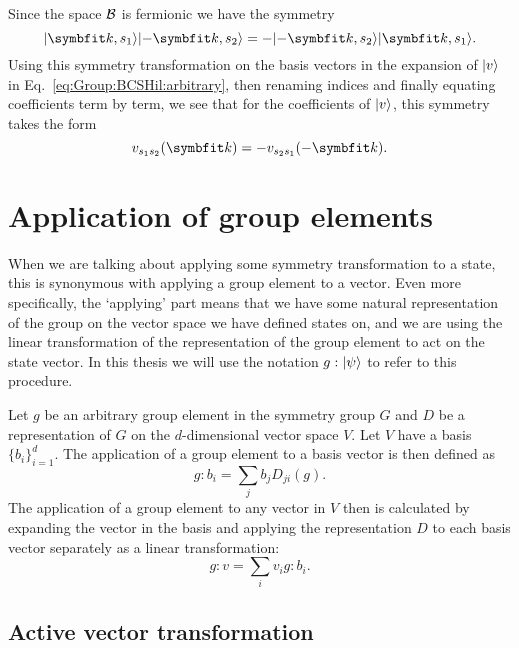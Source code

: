 Since the space $\mathcal{B}$ is fermionic we have the symmetry 
\begin{equation}
    \label{eq:Group:BCSHil:fermSymm}
    \ket{\v{k},s_1}\ket{-\v{k},s_2} = -\ket{-\v{k},s_2}\ket{\v{k},s_1}.
\end{equation}
Using this symmetry transformation on the basis vectors in the expansion of $\lvert v \rangle$ in Eq.~\eqref{eq:Group:BCSHil:arbitrary}, then renaming indices
and finally equating coefficients term by term, we see that for the coefficients of $\lvert v \rangle$, this symmetry takes the form
\begin{equation}
    \label{eq:GroupBCSHil:fermSymmCoeff}
    v_{s_1s_2}(\v{k}) = -v_{s_2s_1}(-\v{k}).
\end{equation}


\section{Application of group elements}

When we are talking about applying some symmetry transformation to a state, this is synonymous with applying a group element to a vector.
Even more specifically, the `applying' part means that we have some natural representation of the group on the vector space we have defined
states on, and we are using the linear transformation of the representation of the group element to act on the state vector. In this
thesis we will use the notation $g:\lvert \psi \rangle$ to refer to this procedure.

Let $g$ be an arbitrary group element in the symmetry group $G$ and $D$ be a representation of $G$ on the $d$-dimensional vector space $V$.
Let $V$ have a basis $\{b_i\}_{i=1}^d$. The application of a group element to a basis vector is then defined as
\begin{equation}
    \label{eq:Group:Prod:basisApp}
    g:b_i = \sum_jb_jD_{ji}(g).
\end{equation}
The application of a group element to any vector in $V$ then is calculated by expanding the vector in the basis and applying the representation
$D$ to each basis vector separately as a linear transformation:
\begin{equation}
    \label{eq:Group:App:linearTransformApp}
    g:v = \sum_iv_ig:b_i.
\end{equation}

\subsection{Active vector transformation}

